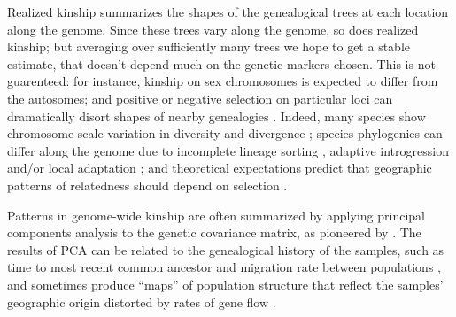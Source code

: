\documentclass[11pt, oneside]{article}   	%
\begin{document}
Realized kinship summarizes the shapes
of the genealogical trees %
at each location along the genome.
Since these trees vary along the genome, so does realized kinship;
but averaging over sufficiently many trees we hope to get a stable estimate,
that doesn't depend much on the genetic markers chosen.
This is not guarenteed:
for instance,
kinship on sex chromosomes is expected to differ from the autosomes;
and positive or negative selection on particular loci can dramatically disort shapes of nearby genealogies
\citep{kim2002hitchhiking,charlesworth1993effect,barton2000genetic}.
Indeed,
many species show chromosome-scale variation in diversity and divergence
\citep[e.g.,][]{langley2012genomic};
species phylogenies can differ along the genome 
due to incomplete lineage sorting \citep[e.g.,][]{pease2013accurate},
adaptive introgression and/or local adaptation \citep[e.g.,][]{ellegren2012genomic,nadeau2012genomic,pool2015natural,vernot2014resurrecting};
and theoretical expectations predict that geographic patterns of relatedness should depend on selection
\citep{charlesworth2003review}.


Patterns in genome-wide kinship are often summarized
by applying principal components analysis \citep[PCA,][]{patterson2006population} 
to the genetic covariance matrix,
as pioneered by \citet{menozzi1978synthetic}.
The results of PCA can be related to the genealogical history of the samples, 
such as time to most recent common ancestor and migration rate between populations \citep{novembre2008interpreting,mcvean2009genealogical}, 
and sometimes produce ``maps'' of population structure
that reflect the samples' geographic origin distorted by rates of gene flow
\citep{novembre2008genes}.
\end{document}

